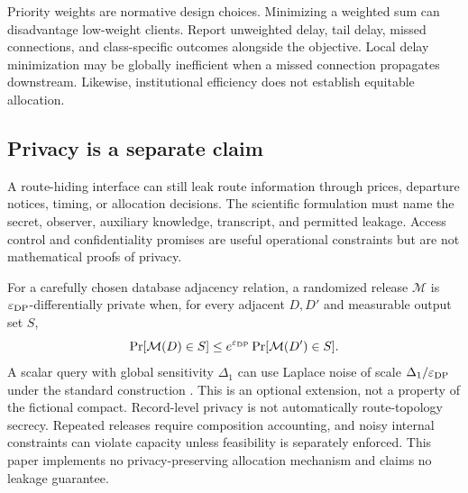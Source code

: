 Priority weights are normative design choices. Minimizing a weighted sum can disadvantage low-weight clients. Report unweighted delay, tail delay, missed connections, and class-specific outcomes alongside the objective. Local delay minimization may be globally inefficient when a missed connection propagates downstream. Likewise, institutional efficiency does not establish equitable allocation.

\subsection{Privacy is a separate claim}
A route-hiding interface can still leak route information through prices, departure notices, timing, or allocation decisions. The scientific formulation must name the secret, observer, auxiliary knowledge, transcript, and permitted leakage. Access control and confidentiality promises are useful operational constraints but are not mathematical proofs of privacy.

For a carefully chosen database adjacency relation, a randomized release $\mathcal M$ is $\varepsilon_{\rm DP}$-differentially private when, for every adjacent $D,D'$ and measurable output set $S$,
\begin{equation}
 \Pr[\mathcal M(D)\in S]\leq e^{\varepsilon_{\rm DP}}
 \Pr[\mathcal M(D')\in S].
\end{equation}
A scalar query with global sensitivity $\Delta_1$ can use Laplace noise of scale $\Delta_1/\varepsilon_{\rm DP}$ under the standard construction \cite{dwork}. This is an optional extension, not a property of the fictional compact. Record-level privacy is not automatically route-topology secrecy. Repeated releases require composition accounting, and noisy internal constraints can violate capacity unless feasibility is separately enforced. This paper implements no privacy-preserving allocation mechanism and claims no leakage guarantee.
